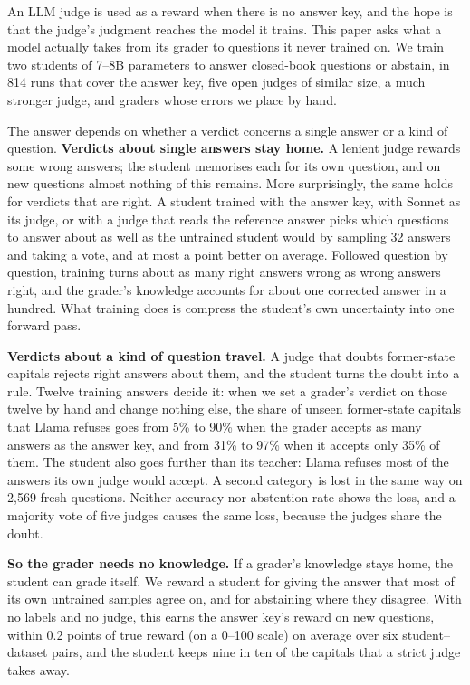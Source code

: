 \documentclass[11pt,a4paper,twocolumn]{article}
\begin{document}
An LLM judge is used as a reward when there is no answer key, and the hope is that the judge's judgment reaches the model it trains. This paper asks what a model actually takes from its grader to questions it never trained on. We train two students of 7--8B parameters to answer closed-book questions or abstain, in 814 runs that cover the answer key, five open judges of similar size, a much stronger judge, and graders whose errors we place by hand.

The answer depends on whether a verdict concerns a single answer or a kind of question. \textbf{Verdicts about single answers stay home.} A lenient judge rewards some wrong answers; the student memorises each for its own question, and on new questions almost nothing of this remains. More surprisingly, the same holds for verdicts that are right. A student trained with the answer key, with Sonnet as its judge, or with a judge that reads the reference answer picks which questions to answer about as well as the untrained student would by sampling 32 answers and taking a vote, and at most a point better on average. Followed question by question, training turns about as many right answers wrong as wrong answers right, and the grader's knowledge accounts for about one corrected answer in a hundred. What training does is compress the student's own uncertainty into one forward pass.

\textbf{Verdicts about a kind of question travel.} A judge that doubts former-state capitals rejects right answers about them, and the student turns the doubt into a rule. Twelve training answers decide it: when we set a grader's verdict on those twelve by hand and change nothing else, the share of unseen former-state capitals that Llama refuses goes from 5\% to 90\% when the grader accepts as many answers as the answer key, and from 31\% to 97\% when it accepts only 35\% of them. The student also goes further than its teacher: Llama refuses most of the answers its own judge would accept. A second category is lost in the same way on 2{,}569 fresh questions. Neither accuracy nor abstention rate shows the loss, and a majority vote of five judges causes the same loss, because the judges share the doubt.

\textbf{So the grader needs no knowledge.} If a grader's knowledge stays home, the student can grade itself. We reward a student for giving the answer that most of its own untrained samples agree on, and for abstaining where they disagree. With no labels and no judge, this earns the answer key's reward on new questions, within 0.2 points of true reward (on a 0--100 scale) on average over six student--dataset pairs, and the student keeps nine in ten of the capitals that a strict judge takes away.
\end{document}
